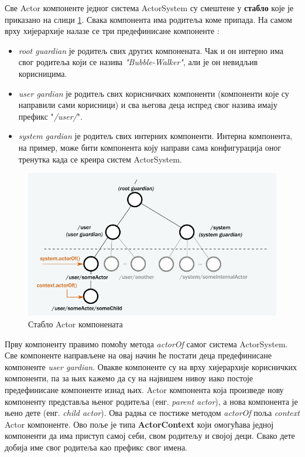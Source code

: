 \documentclass[12pt,oneside]{memoir}
\begin{document}
Све Actor компоненте једног система ActorSystem су смештене у \textbf{стабло} које је приказано на слици \ref{fig:stablo}. Свака компонента има родитеља коме припада. На самом врху хијерархије налазе се три предефинисане компоненте \cite{akkaDoc}:
\begin{itemize}
\item \textit{root guardian} је родитељ свих других компонената. Чак и он интерно има свог родитеља који се назива \textit{"Bubble-Walker"}, али је он невидљив корисницима.
\item \textit{user gardian} је родитељ свих корисничких компоненти (компоненти које су направили сами корисници) и сва његова деца испред свог назива имају префикс "\textit{/user/}".
\item \textit{system gardian} је родитељ свих интерних компоненти. Интерна компонента, на пример, може бити компонента коју направи сама конфигурација оног тренутка када се креира систем ActorSystem. 
\end{itemize}

\begin{figure}[!ht]
  \centering
  \includegraphics[width=1\textwidth]{akkaTree.png}
  \caption{Стабло Actor компонената}
  \label{fig:stablo}
\end{figure}

Прву компоненту правимо помоћу метода \textit{actorOf} самог система ActorSystem. Све компоненте направљене на овај начин ће постати деца предефинисане компоненте \textit{user gardian}. Овакве компоненте су на врху хијерархије корисничких компоненти, па за њих кажемо да су на највишем нивоу иако постоје предефинисане компоненте изнад њих. Actor компонента која произведе нову компоненту представља њеног родитеља (енг. \textit{parent actor}), а нова компонента је њено дете (енг. \textit{child actor}). Ова радња се постиже методом \textit{actorOf} поља \textit{context} Actor компоненте. Ово поље је типа \textbf{ActorContext} који омогућава једној компоненти да има приступ самој себи, свом родитељу и својој деци. Свако дете добија име свог родитеља као префикс свог имена.
\end{document}
